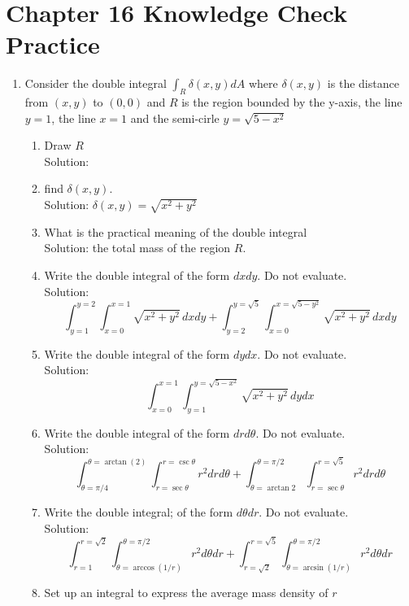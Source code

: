\documentclass[11pt]{article}
\begin{document}
\section{Chapter 16 Knowledge Check Practice}
\begin{enumerate}
  \item  Consider the double integral $\int_R \delta(x,y) dA$ where $\delta(x,y)$ is the distance from $(x,y)$ to $(0,0)$ and $R$ is the region bounded by the y-axis, the line $y=1$, the line $x=1$ and the semi-cirle $y=\sqrt{5-x^2}$
    \renewcommand{\theenumi}{\Alph{enumi}}
  \begin{enumerate}
    \item Draw $R$\\
      Solution: 
    \item find $\delta(x,y)$.\\
      Solution: $\delta(x,y) = \sqrt{x^2+y^2}$
    \item What is the practical meaning of the double integral\\
      Solution: the total mass of the region $R$.
    \item Write the double integral of the form $dxdy$. Do not evaluate.\\
      Solution: \[\int_{y=1}^{y=2} \int_{x=0}^{x=1} \sqrt{x^2+y^2} \, dx dy + \int_{y=2}^{y=\sqrt{5}} \int_{x=0}^{x=\sqrt{5-y^2}} \sqrt{x^2+y^2} \, dx dy\]
    \item Write the double integral of the form $dydx$. Do not evaluate.\\
      Solution: \[\int_{x=0}^{x=1} \int_{y=1}^{y=\sqrt{5-x^2}} \sqrt{x^2+y^2} \, dy dx\]
    \item Write the double integral of the form $drd\theta$. Do not evaluate.\\
      Solution: \[\int_{\theta=\pi/4}^{\theta=\arctan(2)} \int_{r=\sec\theta}^{r=\csc\theta} r^2 dr d\theta + \int_{\theta=\arctan 2}^{\theta=\pi/2} \int_{r=\sec\theta}^{r=\sqrt{5}} r^2 dr d\theta\]
      \item Write the double integral; of the form $d\theta dr$. Do not evaluate.\\
        Solution: \[\int_{r=1}^{r=\sqrt{2}} \int_{\theta=\arccos(1/r)}^{\theta=\pi/2} r^2 d\theta dr + \int_{r=\sqrt{2}}^{r=\sqrt{5}} \int_{\theta=\arcsin(1/r)}^{\theta=\pi/2} r^2 d\theta dr\]
      \item Set up an integral to express the average mass density of $r$\\

\end{enumerate}
\end{enumerate}
\end{document}

